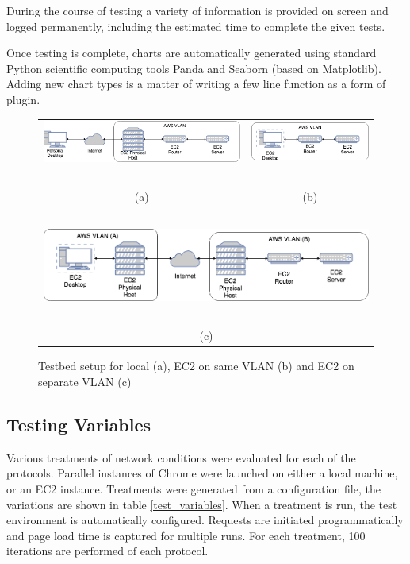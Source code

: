 \documentclass[12pt]{article}
\begin{document}
During the course of testing a variety of information is provided on screen and logged permanently, including the estimated time to complete the given tests.

Once testing is complete, charts are automatically generated using standard Python scientific computing tools Panda and Seaborn (based on Matplotlib). Adding new chart types is a matter of writing a few line function as a form of plugin.

\begin{figure}
\begin{tabular}{c c}
\includegraphics[scale=.25]{images/local.png} & \includegraphics[scale=.25]{images/aws.png}\\
~ & ~ \\
(a) & (b) \\
~ & ~ \\
\multicolumn{2}{c}{\includegraphics[scale=.25]{images/aws_inet.png}} \\
~ & ~ \\
\multicolumn{2}{c}{(c)} \\
\end{tabular}
\caption{Testbed setup for local (a), EC2 on same VLAN (b) and EC2 on separate VLAN (c)}
\label{fig:network}
\end{figure}

\subsection{Testing Variables}
Various treatments of network conditions were evaluated for each of the protocols. Parallel instances of Chrome were launched on either a local machine, or an EC2 instance. Treatments were generated from a configuration file, the variations are shown in table \ref{test_variables}. When a treatment is run, the test environment is automatically configured. Requests are initiated programmatically and page load time is captured for multiple runs. For each treatment, 100 iterations are performed of each protocol.
\end{document}
